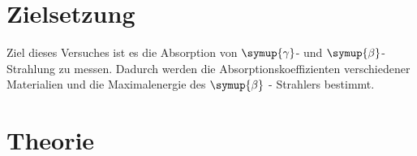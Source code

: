 \section{Zielsetzung}
    Ziel dieses Versuches ist es die Absorption von $\symup{\gamma}$- und $\symup{\beta}$- Strahlung zu messen. Dadurch werden die 
    Absorptionskoeffizienten verschiedener Materialien und die Maximalenergie des $\symup{\beta}$ - Strahlers bestimmt.


\section{Theorie}
\label{sec:Theorie}
